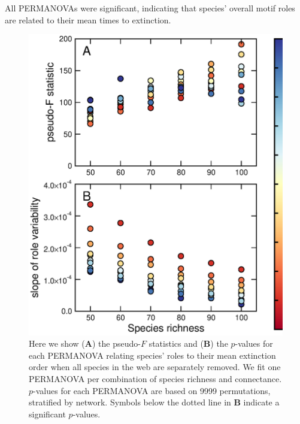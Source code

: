 \documentclass[12pt]{article}
\begin{document}
	All PERMANOVAs were significant, indicating that species' overall motif roles are related to their mean times to extinction.

	\begin{figure}[h!]
		\caption{Here we show (\textbf{A}) the pseudo-$F$ statistics and (\textbf{B}) the $p$-values for each PERMANOVA relating species' roles to their mean extinction order when all species in the web are separately removed. We fit one PERMANOVA per combination of species richness and connectance. $p$-values for each PERMANOVA are based on 9999 permutations, stratified by network. Symbols below the dotted line in \textbf{B} indicate a significant $p$-values. }
		\label{permfig}
		\includegraphics[height=.5\textheight]{figures/extinction_order/permanova_summary_paper_full.eps}
		\end{figure}
\end{document}
